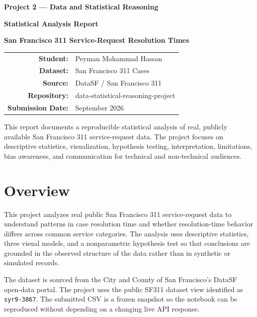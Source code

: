\documentclass[12pt]{article}
\begin{document}
\begin{titlepage}
\thispagestyle{empty}
\centering
\vspace*{1.1in}
{\Large\bfseries Project 2 --- Data and Statistical Reasoning\par}
\vspace{0.22in}
{\LARGE\bfseries Statistical Analysis Report\par}
\vspace{0.5in}
{\large\bfseries San Francisco 311 Service-Request Resolution Times\par}
\vspace{0.7in}
\begin{tabular}{>{\bfseries}rl}
Student: & Peyman Mohammad Hassan \\
Dataset: & San Francisco 311 Cases \\
Source: & DataSF / San Francisco 311 \\
Repository: & data-statistical-reasoning-project \\
Submission Date: & September 2026 \\
\end{tabular}
\vfill
\begin{minipage}{0.84\textwidth}
\centering\small
This report documents a reproducible statistical analysis of real, publicly available San Francisco 311 service-request data. The project focuses on descriptive statistics, visualization, hypothesis testing, interpretation, limitations, bias awareness, and communication for technical and non-technical audiences.
\end{minipage}
\vspace*{0.7in}
\end{titlepage}

\setcounter{page}{1}

\section*{Overview}
This project analyzes real public San Francisco 311 service-request data to understand patterns in case resolution time and whether resolution-time behavior differs across common service categories. The analysis uses descriptive statistics, three visual models, and a nonparametric hypothesis test so that conclusions are grounded in the observed structure of the data rather than in synthetic or simulated records.

The dataset is sourced from the City and County of San Francisco's DataSF open-data portal. The project uses the public SF311 dataset view identified as \texttt{syr9-3867}. The submitted CSV is a frozen snapshot so the notebook can be reproduced without depending on a changing live API response.
\end{document}
